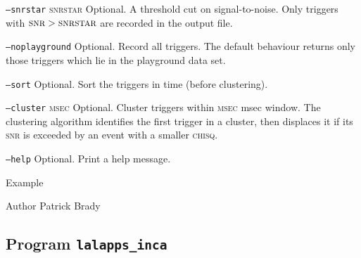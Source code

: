 \begin{entry}
\begin{entry}
\item[\texttt{--snrstar} \textsc{snrstar}] Optional.  A threshold cut
on signal-to-noise.  Only triggers with $\textsc{snr} > \textsc{snrstar}$
are recorded in the output file.

\item[\texttt{--noplayground}] Optional.  Record all triggers.  The
default behaviour returns only those triggers which lie in the
playground data set.  

\item[\texttt{--sort}] Optional.   Sort the triggers in time (before
clustering).  

\item[\texttt{--cluster} \textsc{msec}] Optional.  Cluster triggers
within \textsc{msec} msec window.   The clustering algorithm
identifies the first trigger in a cluster,  then displaces it if its
\textsc{snr} is exceeded by an event with a smaller \textsc{chisq}.

\item[\texttt{--help}] Optional.  Print a help message.
\end{entry}

\item[Example]

\item[Author] 
Patrick Brady
\end{entry}
\clearpage


\subsection{Program \texttt{lalapps\_inca}}
\label{program:lalapps-inca}

